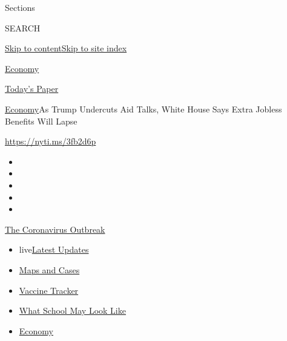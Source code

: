 Sections

SEARCH

\protect\hyperlink{site-content}{Skip to
content}\protect\hyperlink{site-index}{Skip to site index}

\href{https://www.nytimes3xbfgragh.onion/section/business/economy}{Economy}

\href{https://myaccount.nytimes3xbfgragh.onion/auth/login?response_type=cookie\&client_id=vi}{}

\href{https://www.nytimes3xbfgragh.onion/section/todayspaper}{Today's
Paper}

\href{/section/business/economy}{Economy}\textbar{}As Trump Undercuts
Aid Talks, White House Says Extra Jobless Benefits Will Lapse

\url{https://nyti.ms/3fb2d6p}

\begin{itemize}
\item
\item
\item
\item
\item
\end{itemize}

\href{https://www.nytimes3xbfgragh.onion/news-event/coronavirus?action=click\&pgtype=Article\&state=default\&region=TOP_BANNER\&context=storylines_menu}{The
Coronavirus Outbreak}

\begin{itemize}
\tightlist
\item
  live\href{https://www.nytimes3xbfgragh.onion/2020/08/01/world/coronavirus-covid-19.html?action=click\&pgtype=Article\&state=default\&region=TOP_BANNER\&context=storylines_menu}{Latest
  Updates}
\item
  \href{https://www.nytimes3xbfgragh.onion/interactive/2020/us/coronavirus-us-cases.html?action=click\&pgtype=Article\&state=default\&region=TOP_BANNER\&context=storylines_menu}{Maps
  and Cases}
\item
  \href{https://www.nytimes3xbfgragh.onion/interactive/2020/science/coronavirus-vaccine-tracker.html?action=click\&pgtype=Article\&state=default\&region=TOP_BANNER\&context=storylines_menu}{Vaccine
  Tracker}
\item
  \href{https://www.nytimes3xbfgragh.onion/interactive/2020/07/29/us/schools-reopening-coronavirus.html?action=click\&pgtype=Article\&state=default\&region=TOP_BANNER\&context=storylines_menu}{What
  School May Look Like}
\item
  \href{https://www.nytimes3xbfgragh.onion/live/2020/07/31/business/stock-market-today-coronavirus?action=click\&pgtype=Article\&state=default\&region=TOP_BANNER\&context=storylines_menu}{Economy}
\end{itemize}

